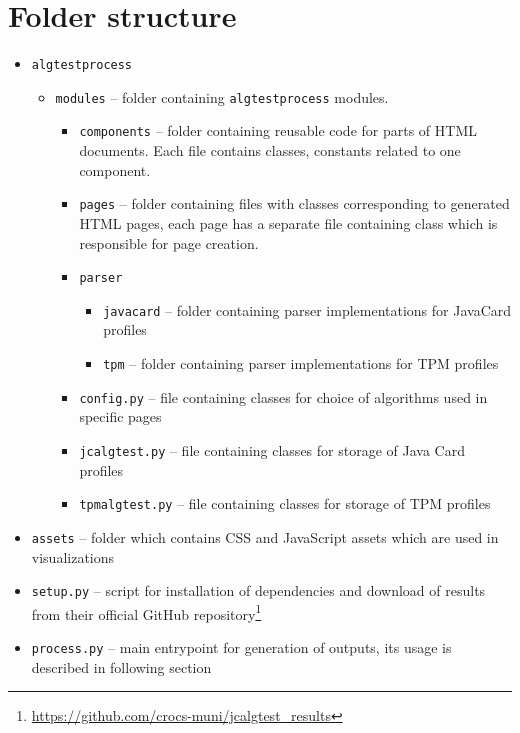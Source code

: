 \section{Folder structure}
\begin{itemize}
    \item \texttt{algtestprocess}
        \begin{itemize}
            \item \texttt{modules} -- folder containing \texttt{algtestprocess} modules.
                \begin{itemize}
                    \item \texttt{components} -- folder containing reusable code for parts of HTML documents. Each file contains classes, constants related to one component.
                    \item \texttt{pages} -- folder containing files with classes corresponding to generated HTML pages, each page has a separate file containing class which is responsible for page creation.
                    \item \texttt{parser}
                        \begin{itemize}
                            \item \texttt{javacard} -- folder containing parser implementations for JavaCard profiles
                            \item \texttt{tpm} -- folder containing parser implementations for TPM profiles
                        \end{itemize}
                    \item \texttt{config.py} -- file containing classes for choice of algorithms used in specific pages
                    \item \texttt{jcalgtest.py} -- file containing classes for storage of Java Card profiles
                    \item \texttt{tpmalgtest.py} -- file containing classes for storage of TPM profiles
                \end{itemize}
        \end{itemize}
    \item \texttt{assets} -- folder which contains CSS and JavaScript assets which are used in visualizations
    \item \texttt{setup.py} -- script for installation of dependencies and download of results from their official GitHub repository\footnote{\url{https://github.com/crocs-muni/jcalgtest_results}}
    \item \texttt{process.py} -- main entrypoint for generation of outputs, its usage is described in following section
\end{itemize}

